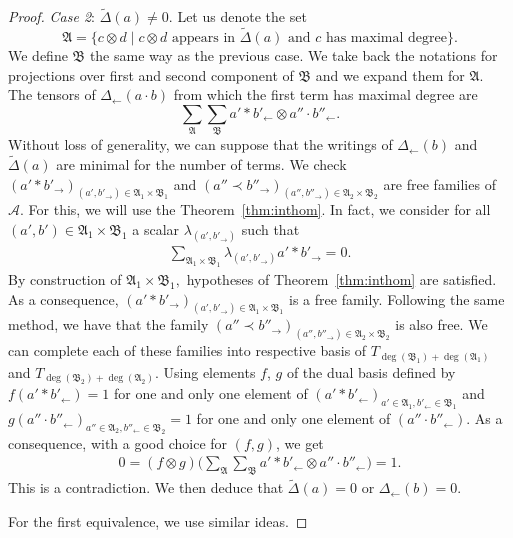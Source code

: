 \documentclass[pdftex]{sigma}
\numberwithin{equation}{section}
\theoremstyle{definition}
\theoremstyle{plain}
\begin{document}
\begin{proof}
	\textit{Case 2}: $\tilde{\Delta}(a)\neq 0$.
	Let us denote the set
	\[
	\mathfrak{A} = \big\{ c\otimes d\mid c\otimes d \text{ appears in }\tilde{\Delta}(a) \text{ and } c \text{ has maximal degree}\big\}.
	\] We define $\mathfrak{B}$ the same way as the previous case.
	We take back the notations for projections over first and second component of $\mathfrak{B}$ and we expand them for $\mathfrak{A}$. The tensors of $\Delta_{\leftarrow}(a\cdot b)$ from which the first term has maximal degree are
	\[
	\sum_{\mathfrak{A}}\sum_{\mathfrak{B}} a'*b'_{\leftarrow}\otimes a''\cdot b''_{\leftarrow}.
	\]
	Without loss of generality, we can suppose that the writings of $\Delta_{\leftarrow}(b)$ and $\tilde{\Delta}(a)$ are minimal for the number of terms.
		We check $(a'* b'_{\rightarrow})_{(a',b'_{\rightarrow})\in\mathfrak{A}_1\times \mathfrak{B}_1}$ and $(a''\prec b''_{\rightarrow})_{(a'',b''_{\rightarrow})\in\mathfrak{A}_2\times \mathfrak{B}_2}$ are free families of $\mathcal{A}$.
	For this, we will use the Theorem~\ref{thm:inthom}. In fact, we consider for all $(a',b')\in\mathfrak{A}_1\times \mathfrak{B}_1$ a scalar $\lambda_{(a',b'_{\rightarrow})}$ such that
	\begin{align*}
		\sum_{\mathfrak{A}_1\times \mathfrak{B}_1}\lambda_{(a',b'_{\rightarrow})}a'*b'_{\rightarrow}=0.
	\end{align*}
	By construction of $\mathfrak{A}_1\times \mathfrak{B}_1,$ hypotheses of Theorem~\ref{thm:inthom} are satisfied. As a consequence, $(a'*b'_{\rightarrow})_{(a',b'_{\rightarrow})\in\mathfrak{A}_1\times \mathfrak{B}_1}$ is a free family. Following the same method, we have that the family $(a''\prec b''_{\rightarrow})_{(a'',b''_{\rightarrow})\in\mathfrak{A}_2\times \mathfrak{B}_2}$ is also free.
	 We can complete each of these families into respective basis of $T_{\deg(\mathfrak{B}_1)+\deg(\mathfrak{A}_1)}$ and $T_{\deg(\mathfrak{B}_2)+\deg(\mathfrak{A}_2)}$.
	Using elements $f$, $g$ of the dual basis defined by ${f(a'*b'_{\leftarrow})=1}$ for one and only one element of $(a'*b'_{\leftarrow})_{a'\in\mathfrak{A}_1,b'_{\leftarrow}\in\mathfrak{B}_1}$ and $g(a''\cdot b''_{\leftarrow})_{a''\in\mathfrak{A}_2,b''_{\leftarrow}\in\mathfrak{B}_2}=1$ for one and only one element of $(a''\cdot b''_{\leftarrow})$.
	As a consequence, with a good choice for $(f,g)$, we get
	\begin{align*}
		0=(f\otimes g)\bigg( 	\sum_{\mathfrak{A}}\sum_{\mathfrak{B}} a'*b'_{\leftarrow}\otimes a''\cdot b''_{\leftarrow} \bigg)=1.
	\end{align*}
This is a contradiction. We then deduce that $\tilde{\Delta}(a)=0$ or $\Delta_{\leftarrow}(b)=0$.
	
	For the first equivalence, we use similar ideas.
\end{proof}
\end{document}
